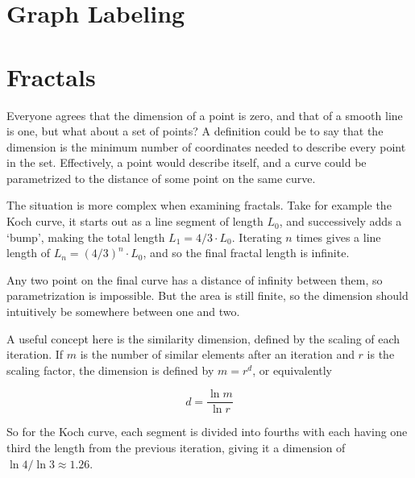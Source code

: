 
\section{Graph Labeling}
\label{sec:GraphLabeling}



\section{Fractals}
\label{sec:fractals}

Everyone agrees that the dimension of a point is zero, and that of a smooth line is one, but what about a set of points? A definition could be to say that the dimension is the minimum number of coordinates needed to describe every point in the set. Effectively, a point would describe itself, and a curve could be parametrized to the distance of some point on the same curve.

The situation is more complex when examining fractals. Take for example the Koch curve, it starts out as a line segment of length $L_0$, and successively adds a `bump', making the total length $L_1 = 4/3 \cdot L_0$. Iterating $n$ times gives a line length of $L_n = {(4 / 3)}^n \cdot L_0$, and so the final fractal length is infinite.

Any two point on the final curve has a distance of infinity between them, so parametrization is impossible. But the area is still finite, so the dimension should intuitively be somewhere between one and two.

A useful concept here is the similarity dimension, defined by the scaling of each iteration. If $m$ is the number of similar elements after an iteration and $r$ is the scaling factor, the dimension is defined by $m = r^d$, or equivalently

\begin{equation}
	d = \frac{\ln m}{\ln r}
\end{equation}

So for the Koch curve, each segment is divided into fourths with each having one third the length from the previous iteration, giving it a dimension of $\ln 4 / \ln 3 \approx 1.26$.

